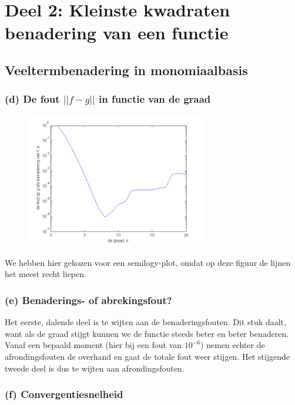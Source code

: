 \documentclass[11pt,a4paper]{article}
\begin{document}
\section{Deel 2: Kleinste kwadraten benadering van een functie}
\subsection{Veeltermbenadering in monomiaalbasis}
\subsubsection*{(d) De fout $||f-g||$ in functie van de graad}

\begin{figure}[H]
	\centering
	\includegraphics[width=0.7\textwidth]{22d1.png}
	\caption*{}
	\end{figure}
	
We hebben hier gekozen voor een semilogy-plot, omdat op deze figuur de lijnen het meest recht liepen.

\subsubsection*{(e) Benaderings- of abrekingsfout?}

Het eerste, dalende deel is te wijten aan de benaderingsfouten. Dit stuk daalt, want als de graad stijgt kunnen we de functie steeds beter en beter benaderen. Vanaf een bepaald moment (hier bij een fout van $10^{-6}$) nemen echter de afrondingsfouten de overhand en gaat de totale fout weer stijgen. Het stijgende tweede deel is dus te wijten aan afrondingsfouten.

\subsubsection*{(f) Convergentiesnelheid}
\end{document}
